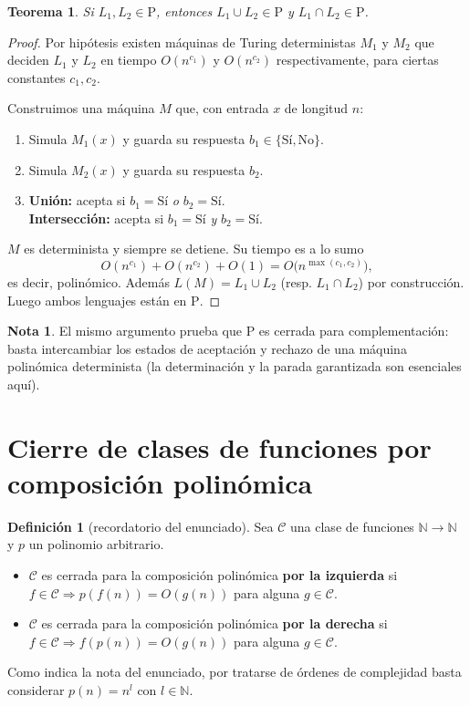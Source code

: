 \documentclass[11pt,a4paper]{article}
\theoremstyle{plain}
\newtheorem{teorema}{Teorema}
\theoremstyle{definition}
\newtheorem{definicion}{Definici\'on}
\newtheorem*{nota}{Nota}
\newcommand{\Pclass}{\mathrm{P}}
\begin{document}
\begin{teorema}
Si $L_1,L_2\in\Pclass$, entonces $L_1\cup L_2\in\Pclass$ y
$L_1\cap L_2\in\Pclass$.
\end{teorema}

\begin{proof}
Por hip\'otesis existen m\'aquinas de Turing deterministas $M_1$ y $M_2$ que deciden
$L_1$ y $L_2$ en tiempo $O(n^{c_1})$ y $O(n^{c_2})$ respectivamente, para ciertas
constantes $c_1,c_2$.

Construimos una m\'aquina $M$ que, con entrada $x$ de longitud $n$:
\begin{enumerate}[nosep]
  \item Simula $M_1(x)$ y guarda su respuesta $b_1\in\{\text{S\'i},\text{No}\}$.
  \item Simula $M_2(x)$ y guarda su respuesta $b_2$.
  \item \textbf{Uni\'on:} acepta si $b_1=\text{S\'i}$ \emph{o} $b_2=\text{S\'i}$.\\
        \textbf{Intersecci\'on:} acepta si $b_1=\text{S\'i}$ \emph{y}
        $b_2=\text{S\'i}$.
\end{enumerate}

$M$ es determinista y siempre se detiene. Su tiempo es a lo sumo
\[
O(n^{c_1}) + O(n^{c_2}) + O(1) = O\!\big(n^{\max(c_1,c_2)}\big),
\]
es decir, polin\'omico. Adem\'as $L(M)=L_1\cup L_2$ (resp. $L_1\cap L_2$) por
construcci\'on. Luego ambos lenguajes est\'an en $\Pclass$.
\end{proof}

\begin{nota}
El mismo argumento prueba que $\Pclass$ es cerrada para complementaci\'on: basta
intercambiar los estados de aceptaci\'on y rechazo de una m\'aquina polin\'omica
determinista (la determinaci\'on y la parada garantizada son esenciales aqu\'i).
\end{nota}

\section{Cierre de clases de funciones por composici\'on polin\'omica}

\begin{definicion}[recordatorio del enunciado]
Sea $\mathcal{C}$ una clase de funciones $\mathbb{N}\to\mathbb{N}$ y $p$ un polinomio
arbitrario.
\begin{itemize}[nosep]
  \item $\mathcal{C}$ es cerrada para la composici\'on polin\'omica \textbf{por la
        izquierda} si $f\in\mathcal{C}\Rightarrow p(f(n))=O(g(n))$ para alguna
        $g\in\mathcal{C}$.
  \item $\mathcal{C}$ es cerrada para la composici\'on polin\'omica \textbf{por la
        derecha} si $f\in\mathcal{C}\Rightarrow f(p(n))=O(g(n))$ para alguna
        $g\in\mathcal{C}$.
\end{itemize}
Como indica la nota del enunciado, por tratarse de \'ordenes de complejidad basta
considerar $p(n)=n^{l}$ con $l\in\mathbb{N}$.
\end{definicion}
\end{document}
